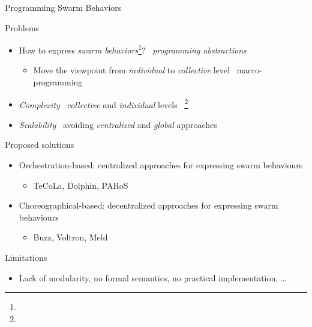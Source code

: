 \documentclass[presentation, 9pt]{beamer}\mode<presentation>{\usetheme{AMSBolognaFC}}
\begin{document}
\begin{frame}{Programming Swarm Behaviors}
	\begin{block}{Problems}
		\begin{itemize}
			\item How to express \emph{swarm behaviors}\footnote{}? \faArrowRight \, \emph{programming abstractions} 
			\begin{itemize}
				\item Move the viewpoint from \emph{individual} to \emph{collective} level \faArrowRight \, macro-programming 
			\end{itemize}
			\item \emph{Complexity} \faArrowRight \, \emph{collective} and \emph{individual} levels \faArrowRight \, \footnote{}
			\item \emph{Scalability} \faArrowRight \, avoiding \emph{centralized} and \emph{global} approaches
		\end{itemize}
	\end{block}
	\begin{alertblock}{Proposed solutions}
		\begin{itemize}
			\item Orchestration-based: centralized approaches for expressing swarm behaviours
			\begin{itemize}
				\item TeCoLa, Dolphin, PARoS
			\end{itemize}
			\item Choreographical-based: decentralized approaches for expressing swarm behaviours
			\begin{itemize}
				\item Buzz, Voltron, Meld
			\end{itemize}
		\end{itemize}
	\end{alertblock}
	\begin{block}{Limitations}
		\begin{itemize}
			\item Lack of modularity, no formal semantics, no practical implementation, \dots
		\end{itemize}
	\end{block}
\end{frame}
\end{document}
